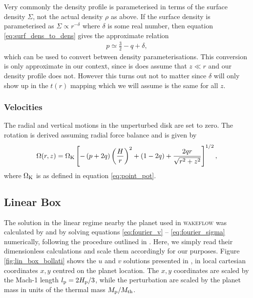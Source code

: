 Very commonly the density profile is parameterised in terms of the surface density $\Sigma$, not the actual density $\rho$ as above.
If the surface density is parameterised as $\Sigma \propto r^{-\delta}$ where $\delta$ is some real number, then equation \ref{eq:surf_dens_to_dens} gives the approximate relation 
\begin{align}
    p \simeq \frac{3}{2} - q + \delta,
\end{align}
which can be used to convert between density parameterisations.
This conversion is only approximate in our context, since is does assume that $z \ll r$ and our density profile does not.
However this turns out not to matter since $\delta$ will only show up in the $t(r)$ mapping which we will assume is the same for all $z$.

\subsubsection{Velocities}

The radial and vertical motions in the unperturbed disk are set to zero. 
The rotation is derived assuming radial force balance \citep[e.g.][]{nelson2013} and is given by 
\begin{align}
    \Omega(r,z) = \Omega_{\rm K} \left[ - \left(p + 2q\right) \left( \frac{H}{r} \right)^2 + \left( 1-2q \right) + \frac{2qr}{\sqrt{r^2 + z^2}}\right]^{1/2}, \label{eq:omega_wf_ps}
\end{align}
where $\Omega_{\rm K}$ is as defined in equation \ref{eq:point_pot}.

\subsection{Linear Box} \label{sec:linear_box}

The solution in the linear regime nearby the planet used in \textsc{wakeflow} was calculated by \citet{bollati2020} and \citet{bollati2021} by solving equations \ref{eq:fourier_v} -- \ref{eq:fourier_sigma} numerically, following the procedure outlined in \citet{goodman2001}.
Here, we simply read their dimensionless calculations and scale them accordingly for our purposes. Figure \ref{fig:lin_box_bollati} shows the $u$ and $v$ solutions presented in \citet{bollati2021}, in local cartesian coordinates $x,y$ centred on the planet location.
The $x,y$ coordinates are scaled by the Mach-1 length $l_{\rm p} = 2H_{\rm p}/3$, while the perturbation are scaled by the planet mass in units of the thermal mass $M_{\rm p} / M_{\rm th}$.


